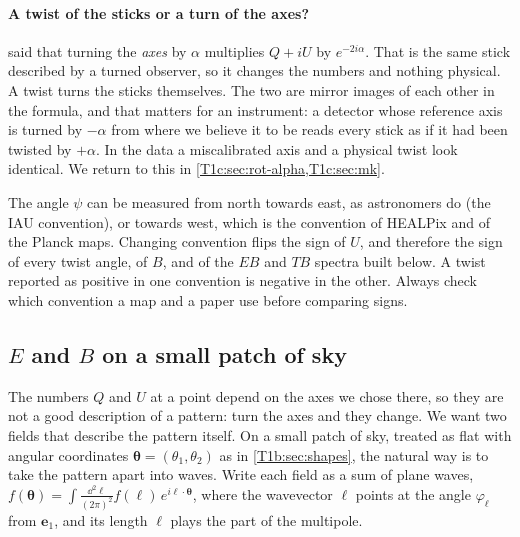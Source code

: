 \paragraph{A twist of the sticks or a turn of the axes?}  said that turning the \emph{axes} by $\alpha$ multiplies $Q+iU$ by $e^{-2i\alpha}$. That is the same stick described by a turned observer, so it changes the numbers and nothing physical. A twist turns the sticks themselves. The two are mirror images of each other in the formula, and that matters for an instrument: a detector whose reference axis is turned by $-\alpha$ from where we believe it to be reads every stick as if it had been twisted by $+\alpha$. In the data a miscalibrated axis and a physical twist look identical. We return to this in \cref{T1c:sec:rot-alpha,T1c:sec:mk}.

\begin{pitfall}
The angle $\psi$ can be measured from north towards east, as astronomers do (the IAU convention), or towards west, which is the convention of HEALPix and of the Planck maps. Changing convention flips the sign of $U$, and therefore the sign of every twist angle, of $B$, and of the $EB$ and $TB$ spectra built below. A twist reported as positive in one convention is negative in the other. Always check which convention a map and a paper use before comparing signs.
\end{pitfall}

\subsection{\texorpdfstring{$E$}{E} and \texorpdfstring{$B$}{B} on a small patch of sky}
\label{T1c:sec:eb-flat}

The numbers $Q$ and $U$ at a point depend on the axes we chose there, so they are not a good description of a pattern: turn the axes and they change. We want two fields that describe the pattern itself. On a small patch of sky, treated as flat with angular coordinates $\bm\theta=(\theta_1,\theta_2)$ as in \cref{T1b:sec:shapes}, the natural way is to take the pattern apart into waves. Write each field as a sum of plane waves, $f(\bm\theta)=\int\frac{\dd^2\bm\ell}{(2\pi)^2}f(\bm\ell)\,e^{i\bm\ell\cdot\bm\theta}$, where the wavevector $\bm\ell$ points at the angle $\varphi_{\bm\ell}$ from $\bm e_1$, and its length $\ell$ plays the part of the multipole.


